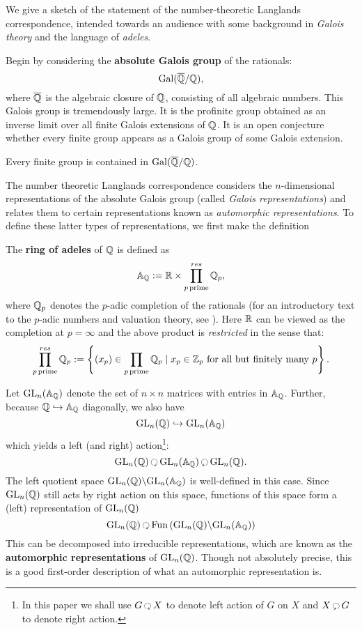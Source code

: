 We give a sketch of the statement of the number-theoretic Langlands correspondence, intended towards an audience with some background in \emph{Galois theory} and the language of \emph{adeles}. 

Begin by considering the \textbf{absolute Galois group} of the rationals:
\[
	\mathrm{Gal}(\overline{\mathbb{Q}}/\mathbb{Q}),
\]
where $\overline{\mathbb{Q}}$ is the algebraic closure of $\mathbb{Q}$, consisting of all algebraic numbers. This Galois group is tremendously large. It is the profinite group obtained as an inverse limit over all finite Galois extensions of $\mathbb{Q}$. It is an open conjecture whether every finite group appears as a Galois group of some Galois extension. 
\begin{conj}
	Every finite group is contained in $\mathrm{Gal}(\overline{\mathbb{Q}}/\mathbb{Q})$.
\end{conj}
The number theoretic Langlands correspondence considers the $n$-dimensional representations of the absolute Galois group (called \emph{Galois representations}) and relates them to certain representations known as \emph{automorphic representations}. To define these latter types of representations, we first make the definition
\begin{defn}
	The \textbf{ring of adeles} of $\mathbb{Q}$ is defined as 
	\[
		\mathbb A_{\mathbb{Q}} := \mathbb{R} \times \prod_{p\, \mathrm{prime}}^{res} \mathbb{Q}_p,
	\]
	where $\mathbb{Q}_p$ denotes the $p$-adic completion of the rationals (for an introductory text to the $p$-adic numbers and valuation theory, see \cite{bachman1964}). Here $\mathbb{R}$ can be viewed as the completion at $p=\infty$ and the above product is \emph{restricted} in the sense that:
	\[
		\prod_{p\, \mathrm{prime}}^{res} \mathbb{Q}_p := \left\{ (x_p) \in \prod_{p\, \mathrm{prime}} \mathbb{Q}_p \mid x_p \in \mathbb Z_p \text{ for all but finitely many } p\right\}.
	\]
\end{defn}
Let $\mathrm{GL}_n(\mathbb A_{\mathbb{Q}})$ denote the set of $n \times n$ matrices with entries in $\mathbb A_{\mathbb{Q}}$. Further, because $\mathbb{Q} \hookrightarrow \mathbb A_{\mathbb{Q}}$ diagonally, we also have 
\[
	\mathrm{GL}_n(\mathbb{Q}) \hookrightarrow \mathrm{GL}_n(\mathbb A_{\mathbb{Q}})
\]
which yields a left (and right) action\footnote{In this paper we shall use $G\lacts X$ to denote left action of $G$ on $X$ and $X \racts G$ to denote right action.}:
\[
	\GL_n(\qq) \lacts  \GL_n(\mathbb A_\qq) \racts  \GL_n(\qq).
\]
The left quotient space $\mathrm{GL}_n(\mathbb{Q}) \backslash \mathrm{GL}_n(\mathbb A_{\mathbb{Q}})$ is well-defined in this case. Since $\mathrm{GL}_n(\mathbb{Q})$ still acts by right action on this space, functions of this space form a (left) representation of $\mathrm{GL}_n(\mathbb{Q})$
\[
	\GL_n(\qq) \lacts \mathrm{Fun}\left( \GL_n(\qq) \backslash \GL_n(\mathbb A_\qq) \right)
\]
This can be decomposed into irreducible representations, which are known as the \textbf{automorphic representations} of $\mathrm{GL}_n(\mathbb{Q})$.
Though not absolutely precise, this is a good first-order description of what an automorphic representation is. 


